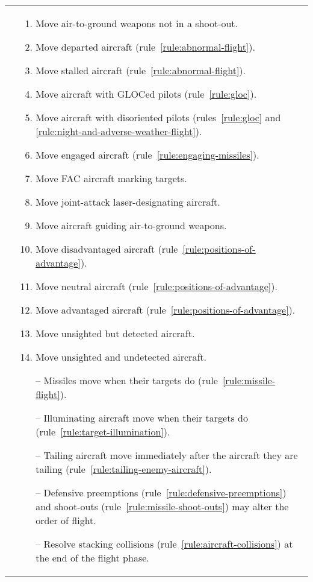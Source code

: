 \begin{twocolumntablefloat}
\begin{twocolumntable}
\begin{tabularx}{1.0\linewidth}{L@{\hspace{\columnsep}}L}
{&

\begin{enumerate}[topsep=0pt,start=7]


\begin{enumerate}[nosep]
    \item Move air-to-ground weapons not in a shoot-out.
    \item Move departed aircraft (rule~\ref{rule:abnormal-flight}).
    \item Move stalled aircraft (rule~\ref{rule:abnormal-flight}).
    \item Move aircraft with GLOCed pilots (rule~\ref{rule:gloc}).
    \item Move aircraft with disoriented pilots (rules~\ref{rule:gloc} and \ref{rule:night-and-adverse-weather-flight}).
    \item Move engaged aircraft (rule~\ref{rule:engaging-missiles}).
    \item Move FAC aircraft marking targets.
    \item Move joint-attack laser-designating aircraft.
    \item Move aircraft guiding air-to-ground weapons.
    \item Move disadvantaged aircraft (rule~\ref{rule:positions-of-advantage}).
    \item Move neutral aircraft (rule~\ref{rule:positions-of-advantage}).
    \item Move advantaged aircraft (rule~\ref{rule:positions-of-advantage}).
    \item Move unsighted but detected aircraft.
    \item Move unsighted and undetected aircraft.
    \item[--] Missiles move when their targets do (rule~\ref{rule:missile-flight}).
    \item[--] Illuminating aircraft move when their targets do (rule~\ref{rule:target-illumination}).
    \item[--] Tailing aircraft move immediately after the aircraft they are tailing (rule~\ref{rule:tailing-enemy-aircraft}).
    \item[--] Defensive preemptions (rule~\ref{rule:defensive-preemptions})  and shoot-outs (rule~\ref{rule:missile-shoot-outs}) may alter the order of flight.
    \item[--] Resolve stacking collisions (rule~\ref{rule:aircraft-collisions}) at the end of the flight phase.
\end{enumerate}


\end{enumerate}}
\end{tabularx}
\end{twocolumntable}
\end{twocolumntablefloat}
